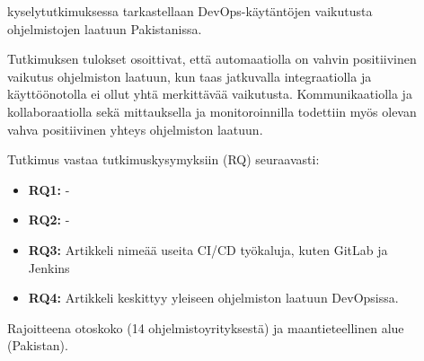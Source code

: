\documentclass[bscthesis,finnish,oneside,biblatex]{uefcsthesis}
\begin{document}
\begin{description}
    \item[\cite{saleem2023_survey}] kyselytutkimuksessa tarkastellaan DevOps-käytäntöjen vaikutusta ohjelmistojen laatuun Pakistanissa.

    Tutkimuksen tulokset osoittivat, että automaatiolla on vahvin positiivinen vaikutus ohjelmiston laatuun, kun taas jatkuvalla integraatiolla ja käyttöönotolla ei ollut yhtä merkittävää vaikutusta. Kommunikaatiolla ja kollaboraatiolla sekä mittauksella ja monitoroinnilla todettiin myös olevan vahva positiivinen yhteys ohjelmiston laatuun.

    Tutkimus vastaa tutkimuskysymyksiin (RQ) seuraavasti:
    \begin{itemize}
        \item \textbf{RQ1:} -
        \item \textbf{RQ2:} -
        \item \textbf{RQ3:} Artikkeli nimeää useita CI/CD työkaluja, kuten GitLab ja Jenkins
        \item \textbf{RQ4:} Artikkeli keskittyy yleiseen ohjelmiston laatuun DevOpsissa.
    \end{itemize}

    Rajoitteena otoskoko (14 ohjelmistoyrityksestä) ja maantieteellinen alue (Pakistan).
\end{description}
\end{document}
